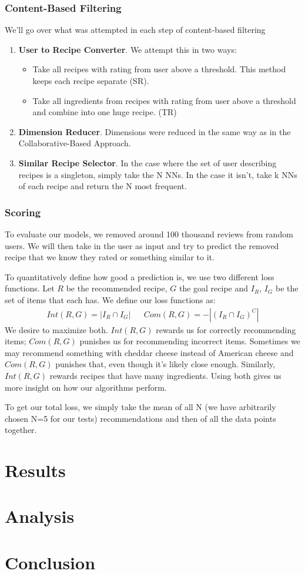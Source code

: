 \documentclass[11pt]{article}
\begin{document}
\subsubsection{Content-Based Filtering}
We'll go over what was attempted in each step of content-based filtering
\begin{enumerate}
    \item \textbf{User to Recipe Converter}. We attempt this in two ways:
    \begin{itemize}
        \item Take all recipes with rating from user above a threshold. This method keeps each recipe separate (SR).
        \item Take all ingredients from recipes with rating from user above a threshold and combine into one huge recipe. (TR) 
    \end{itemize}
    \item \textbf{Dimension Reducer}. Dimensions were reduced in the same way as in the Collaborative-Based Approach.
    \item \textbf{Similar Recipe Selector}. In the case where the set of user describing recipes is a singleton, simply take the N NNs. In the case it isn't, take k NNs of each recipe and return the N most frequent.
\end{enumerate}

\subsubsection{Scoring}

To evaluate our models, we removed around 100 thousand reviews from random users. We will then take in the user as input and try to predict the removed recipe that we know they rated or something similar to it.

To quantitatively define how good a prediction is, we use two different loss functions.  Let $R$ be the recommended recipe, $G$ the goal recipe and $I_R$, $I_G$ be the set of items that each has. We define our loss functions as:
\begin{align}
    Int(R,G) = |I_R \cap I_G| && Com(R,G) = -|(I_R \cap I_G)^C|
\end{align}
We desire to maximize both. $Int(R,G)$ rewards us for correctly recommending items; $Com(R,G)$ punishes us for recommending incorrect items. Sometimes we may recommend something with cheddar cheese instead of American cheese and $Com(R,G)$ punishes that, even though it's likely close enough. Similarly, $Int(R,G)$ rewards recipes that have many ingredients. Using both gives us more insight on how our algorithms perform.

To get our total loss, we simply take the mean of all N (we have arbitrarily chosen N=5 for our tests) recommendations and then of all the data points together.
\section{Results}

\section{Analysis}

\section{Conclusion}



\end{document}
